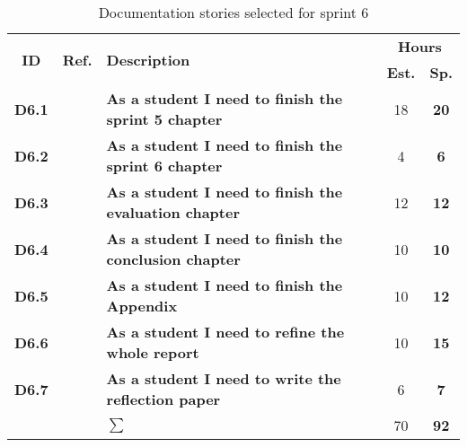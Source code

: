 \begin{table*}[!ht]%
 \def\arraystretch{1.25}
 
 \caption{Documentation stories selected for sprint 6}
   \label{tab:sprint6Documentationstories}

\begin{tabularx}{\textwidth}{ccXcc} 

\toprule[0.5mm]
\multirow{2}{*}{\textbf{ID}} &
\multirow{2}{*}{\textbf{Ref.}} & \multirow{2}{*}{\textbf{Description}} & \multicolumn{2}{c}{\textbf{Hours}} \\
 					& & & \textbf{Est.} & \textbf{Sp.} \\
\midrule

\textbf{D6.1} 	& & {\bf As a student I need to finish the sprint 5 chapter} 		& 18  & \textbf{20} \\
	
\textbf{D6.2} 	& & {\bf As a student I need to finish the sprint 6 chapter} 		& 4	& \textbf{6} \\

\textbf{D6.3} 	& & {\bf As a student I need to finish the evaluation chapter} 		& 12	& \textbf{12} \\

\textbf{D6.4} 	&& {\bf As a student I need to finish the conclusion chapter} 		& 10	& \textbf{10} \\

\textbf{D6.5} 	&& {\bf As a student I need to finish the Appendix} 				& 10	& \textbf{12} \\

\textbf{D6.6} 	&& {\bf As a student I need to refine the whole report} 			& 10	& \textbf{15} \\
\textbf{D6.7} 	&& {\bf As a student I need to write the reflection paper} 			& 6	& \textbf{7} \\
\midrule
		
				&& \textbf{$\sum$}		&	70	& \textbf{92}
 \\																			
\bottomrule[0.5mm]
\end{tabularx}
\end{table*}
